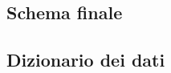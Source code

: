 \documentclass[11pt]{article}
\begin{document}
\subsection{Schema finale}
\begin{figure}[H]
    \centering
\end{figure}


\subsection{Dizionario dei dati}
\end{document}
